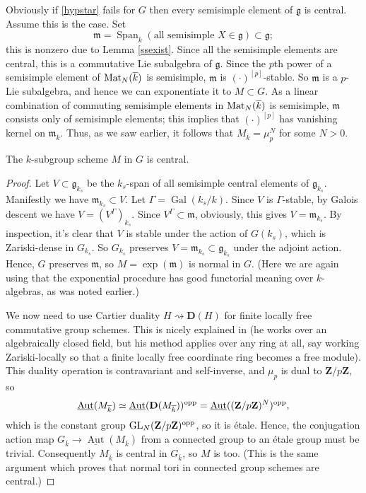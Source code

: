 \documentclass[10pt]{article}
\newcommand{\ZZ}{\mathbf{Z}}
\renewcommand{\(}{\left(}
\renewcommand{\)}{\right)}
\numberwithin{thm}{subsection}
\begin{document}
Obviously if \eqref{hypstar} fails for $G$ 
then every semisimple element of $\mathfrak{g}$ is central.
Assume this is the case.
Set $$\mathfrak{m}= \operatorname{Span}_k(\text{all semisimple }X\in \mathfrak{g})\subset \mathfrak{g};$$
this is nonzero due to Lemma \ref{ssexist}. 
Since all the semisimple elements are central, this is a  commutative Lie subalgebra of $\mathfrak{g}$.
Since the $p$th power of a semisimple element of ${\rm{Mat}}_N(\overline{k})$ is semisimple,
$\mathfrak{m}$ is $(\cdot)^{[p]}$-stable.
So $\mathfrak{m}$ is a $p$-Lie subalgebra,
and hence we can exponentiate it to $M\subset G$.
As a linear combination of commuting semisimple elements in
${\rm{Mat}}_N(\overline{k})$ is semisimple,
$\mathfrak{m}$ consists only of semisimple elements;
this implies that $(\cdot)^{[p]}$ has vanishing kernel on $\mathfrak{m}_{\overline{k}}$.
Thus, as we saw earlier, it follows that $M_{\overline{k}}=\mu_p^N$ for some $N > 0$. 

\begin{lemma}\label{centralm}
The $k$-subgroup scheme $M$ in $G$ is central.  
\end{lemma}

\begin{proof}
Let $V\subset \mathfrak{g}_{k_s}$
be the $k_s$-span of all semisimple central elements of $\mathfrak{g}_{k_s}$.
Manifestly we have $\mathfrak{m}_{k_s}\subset V$.
Let $\Gamma=\operatorname{Gal}(k_s/k)$.
Since $V$ is $\Gamma$-stable, by Galois descent we have
$V=(V^\Gamma)_{k_s}$.
Since $V^\Gamma\subset \mathfrak{m}$, obviously,
this gives $V=\mathfrak{m}_{k_s}$.
By inspection, it's clear that $V$ is stable
under the action of $G(k_s)$, which is Zariski-dense in $G_{k_s}$.
So $G_{k_s}$ preserves $V=\mathfrak{m}_{k_s}\subset \mathfrak{g}_{k_s}$
under the adjoint action.  
Hence, $G$ preserves $\mathfrak{m}$, so 
$M=\exp(\mathfrak{m})$ is normal in $G$.
(Here we are again using that the exponential procedure has good functorial meaning
over $k$-algebras, as was noted earlier.) 

We now need to use Cartier duality $H \rightsquigarrow \mathbf{D}(H)$ for finite locally free commutative group schemes.  This
is nicely explained in \cite[\S14]{mumford} (he works over an algebraically closed
field, but his method applies over any ring at all, say working Zariski-locally so that a finite locally free
coordinate ring becomes a free module).   This duality operation is contravariant and self-inverse, and 
$\mu_p$ is dual to $\ZZ/p\ZZ$, so 
$$\underline{\operatorname{Aut}}(M_{\overline{k}})
\simeq \underline{\rm{Aut}}(\mathbf{D}(M_{\overline{k}}))^{\rm{opp}} = \underline{\operatorname{Aut}}((\mathbf{Z}/p\mathbf{Z})^N)^{\rm{opp}},$$
which is the constant group ${\rm{GL}}_N(\mathbf{Z}/p\mathbf{Z})^{\rm{opp}}$, so it is \'etale.  
Hence, the conjugation action map
$G_{\overline{k}}\rightarrow\underline{\operatorname{Aut}}(M_{\overline{k}})$ 
from a connected group to an \'etale group must be trivial. 
Consequently $M_{\overline{k}}$ is central in $G_{\overline{k}}$, so $M$ is too.
(This is the same argument which proves that normal tori in connected group schemes
are central.) 
\end{proof}
\end{document}
